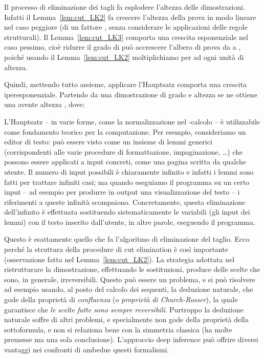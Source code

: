 \documentclass[12pt,a4paper,openright,twoside]{report}
\begin{document}
Il processo di eliminazione dei tagli fa esplodere l'altezza delle dimostrazioni. Infatti il Lemma~\ref{lem:cut_LK2} fa crescere l'altezza della prova in modo lineare nel caso peggiore (di un fattore , senza considerare le applicazioni delle regole strutturali). Il Lemma~\ref{lem:cut_LK3} comporta una crescita esponenziale nel caso pessimo, cio\`e ridurre il grado di  pu\`o accrescere l'albero di prova da  a , poich\'e usando il Lemma~\ref{lem:cut_LK2} moltiplichiamo per  ad ogni unit\`a di altezza.

Quindi, mettendo tutto assieme, applicare l'Hauptsatz comporta una crescita iperesponenziale. Partendo da una dimostrazione di grado  e altezza  se ne ottiene una avente altezza , dove:


L'Hauptsatz -- in varie forme, come la normalizzazione nel -calcolo -- \`e utilizzabile come fondamento teorico per la computazione. Per esempio, consideriamo un editor di testo: pu\`o essere visto come un insieme di lemmi generici (corrispondenti alle varie procedure di formattazione, impaginazione, \ldots) che possono essere applicati a input concreti, come una pagina scritta da qualche utente. Il numero di input possibili \`e chiaramente infinito e infatti i lemmi sono fatti per trattare infiniti casi; ma quando eseguiamo il programma su un certo input -- ad esempio per produrre in output una visualizzazione del testo -- i riferimenti a queste infinit\`a scompaiono. Concretamente, questa eliminazione dell'infinito \`e effettuata sostituendo sistematicamente le variabili (gli input dei lemmi) con il testo inserito dall'utente, in altre parole, eseguendo il programma. 

Questo \`e esattamente quello che fa l'algoritmo di eliminazione del taglio. Ecco perch\'e la struttura della procedure di cut elimination \`e cos\`i importante (osservazione fatta nel Lemma~\ref{lem:cut_LK2}). La strategia adottata nel ristrutturare la dimostrazione, effettuando le sostituzioni, produce delle scelte che sono, in generale, irreversibili. Questo pu\`o essere un problema, e si pu\`o risolvere ad esempio usando, al posto del calcolo dei sequenti, la deduzione naturale, che gode della propriet\`a di \emph{confluenza} (o \emph{propriet\`a di Church-Rosser}), la quale garantisce che \emph{le scelte fatte sono sempre reversibili}. Purtroppo la deduzione naturale soffre di altri problemi, e specialmente non gode della propriet\`a della sottoformula, e non si relaziona bene con la simmetria classica (ha molte premesse ma una sola conclusione). L'approccio deep inference pu\`o offrire diversi vantaggi nei confronti di ambedue questi formalismi.
\end{document}
